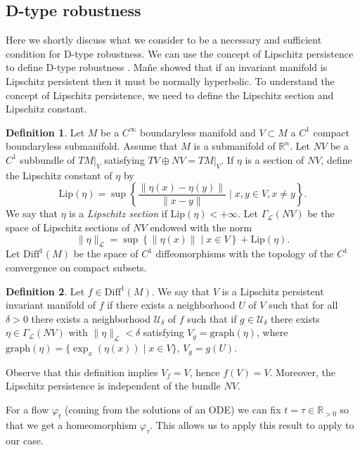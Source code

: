 \documentclass{article} %
\newcounter{ct}
\newcommand{\reals}{\mathbb{R}}
\theoremstyle{definition}
\newtheorem{definition}{Definition}
\theoremstyle{remark}
\begin{document}
\subsection{D-type robustness}\label{sec:persitencempliesnh}
Here we shortly discuss what we consider to be a necessary and sufficient condition for D-type robustness.
We can use the concept of Lipschitz persistence to define D-type robustness \citep{mane1978persistent}.
Ma\~{n}e showed that if an invariant manifold is Lipschitz persistent then it must be normally hyperbolic.
To understand the concept of Lipschitz persistence, we need to define the Lipschitz section and Lipschitz constant.
\begin{definition}
Let \(M\) be a \(C^{\infty}\) boundaryless manifold and \(V \subset M\) a \(C^1\) compact boundaryless submanifold.
Assume that \(M\) is a submanifold of \(\mathbb{R}^n\). Let \(NV\) be a \(C^1\) subbundle of \(TM|_V\) satisfying \(TV \oplus NV = TM|_V\).
If \(\eta\) is a section of \(NV\), define the Lipschitz constant of \(\eta\) by
\[
\mathrm{Lip}(\eta) = \sup \left\{ \frac{\|\eta(x) - \eta(y)\|}{\|x - y\|} \mid x, y \in V, x \neq y \right\}.
\]
We say that \(\eta\) is a \emph{Lipschitz section} if \(\mathrm{Lip}(\eta) < +\infty\).
Let \(\Gamma_{\mathcal{L}}(NV)\) be the space of Lipschitz sections of \(NV\) endowed with the norm
\[
\|\eta\|_{\mathcal{L}} = \sup \left\{ \|\eta(x)\| \mid x \in V \right\} + \mathrm{Lip}(\eta).
\]
Let \(\mathrm{Diff}^1(M)\) be the space of \(C^1\) diffeomorphisms with the topology of the \(C^1\) convergence on compact subsets.
\end{definition}

\begin{definition}
 Let \(f \in \mathrm{Diff}^1(M)\).
 We say that \(V\) is a Lipschitz persistent invariant manifold of \(f\) if there exists a neighborhood \(U\) of \(V\) such that for all \(\delta > 0\) there exists a neighborhood \(\mathcal{U}_\delta\) of \(f\) such that if \(g \in \mathcal{U}_\delta\) there exists \(\eta \in \Gamma_{\mathcal{L}}(NV)\) with \(\|\eta\|_{\mathcal{L}} < \delta\) satisfying \(V_g = \mathrm{graph}(\eta)\), where \(\mathrm{graph}(\eta) = \{\exp_x(\eta(x)) \mid x \in V\}\), \(V_g = g(U)\).

Observe that this definition implies \(V_f = V\), hence \(f(V) = V\). Moreover, the Lipschitz persistence is independent of the bundle \(NV\).
\end{definition}


For a flow \(\varphi_t\) (coming from the solutions of an ODE) we can fix \(t=\tau\in\reals_{>0}\) so that we get a homeomorphism \(\varphi_\tau\).
This allows us to apply this result to apply to our case.
\end{document}
